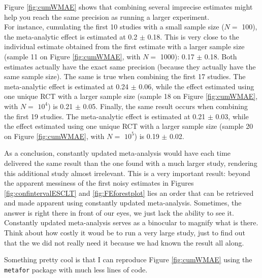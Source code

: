 \documentclass[]{book}
\newenvironment{Shaded}{\begin{snugshade}}{\end{snugshade}}
\newcommand{\DataTypeTok}[1]{\textcolor[rgb]{0.13,0.29,0.53}{#1}}
\newcommand{\KeywordTok}[1]{\textcolor[rgb]{0.13,0.29,0.53}{\textbf{#1}}}
\newcommand{\NormalTok}[1]{#1}
\newcommand{\OperatorTok}[1]{\textcolor[rgb]{0.81,0.36,0.00}{\textbf{#1}}}
\newcommand{\StringTok}[1]{\textcolor[rgb]{0.31,0.60,0.02}{#1}}
\theoremstyle{definition}
\theoremstyle{definition}
\theoremstyle{definition}
\theoremstyle{remark}
\let\BeginKnitrBlock\begin \let\EndKnitrBlock\end
\begin{document}
Figure \ref{fig:cumWMAE} shows that combining several imprecise estimates might help you reach the same precision as running a larger experiment.\\
For instance, cumulating the first 10 studies with a small sample size (\(N=\) 100), the meta-analytic effect is estimated at 0.2 \(\pm\) 0.18.
This is very close to the individual estimate obtained from the first estimate with a larger sample size (sample 11 on Figure \ref{fig:cumWMAE}, with \(N=\) 1000): 0.17 \(\pm\) 0.18.
Both estimates actually have the exact same precision (because they actually have the same sample size).
The same is true when combining the first 17 studies.
The meta-analytic effect is estimated at 0.24 \(\pm\) 0.06, while the effect estimated using one unique RCT with a larger sample size (sample 18 on Figure \ref{fig:cumWMAE}, with \(N=\) \ensuremath{10^{4}}) is 0.21 \(\pm\) 0.05.
Finally, the same result occurs when combining the first 19 studies.
The meta-analytic effect is estimated at 0.21 \(\pm\) 0.03, while the effect estimated using one unique RCT with a larger sample size (sample 20 on Figure \ref{fig:cumWMAE}, with \(N=\) \ensuremath{10^{5}}) is 0.19 \(\pm\) 0.02.

As a conclusion, constantly updated meta-analysis would have each time delivered the same result than the one found with a much larger study, rendering this additional study almost irrelevant.
This is a very important result: beyond the apparent messiness of the first noisy estimates in Figures \ref{fig:confintervalESCLT} and \ref{fig:FEforestplot} lies an order that can be retrieved and made apparent using constantly updated meta-analysis.
Sometimes, the answer is right there in front of our eyes, we just lack the ability to see it.
Constantly updated meta-analysis serves as a binocular to magnify what is there.
Think about how costly it woud be to run a very large study, just to find out that the we did not really need it because we had known the result all along.

\BeginKnitrBlock{remark}
\iffalse{} {Remark. } \fi{}Something pretty cool is that I can reproduce Figure \ref{fig:cumWMAE} using the \texttt{metafor} package with much less lines of code.
\EndKnitrBlock{remark}

\begin{Shaded}
\end{Shaded}
\end{document}

